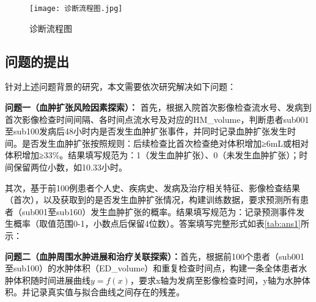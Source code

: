 \documentclass[bwprint]{gmcmthesis}
\begin{document}
			\begin{figure}[H]
				\centering
				\texttt{[image: 诊断流程图.jpg]}
				\caption{诊断流程图}
				\label{fig:1}
			\end{figure}
		
		
		\subsection{问题的提出}
		
		
			针对上述问题背景的研究，本文需要依次研究解决如下问题：
			
			\textbf{问题一（血肿扩张风险因素探索）：} 首先，根据入院首次影像检查流水号、发病到首次影像检查时间间隔、各时间点流水号及对应的HM\_volume，判断患者sub001至sub100发病后48小时内是否发生血肿扩张事件，并同时记录血肿扩张发生时间。是否发生血肿扩张按照规则：后续检查比首次检查绝对体积增加≥6mL或相对体积增加≥33\%。结果填写规范为：1（发生血肿扩张）、0（未发生血肿扩张）；时间保留两位小数，如10.33小时。
			
			其次，基于前100例患者个人史、疾病史、发病及治疗相关特征、影像检查结果（首次），以及获取到的是否发生血肿扩张情况，构建训练数据，要求预测所有患者（sub001至sub160）发生血肿扩张的概率。结果填写规范为：记录预测事件发生概率（取值范围0-1，小数点后保留4位数）。答案填写完整形式如表\ref{tab:ans1}所示：
			
			\begin{table}[H]
				\caption{问题一答案样式}
				\label{tab:ans1}
			\end{table}
			
			
			\textbf{问题二（血肿周围水肿进展和治疗关联探索）：}首先，根据前100个患者（sub001至sub100）的水肿体积（ED\_volume）和重复检查时间点，构建一条全体患者水肿体积随时间进展曲线$y=f(x)$，要求x轴为发病至影像检查时间，y轴为水肿体积。并记录真实值与拟合曲线之间存在的残差。
			
\end{document}
